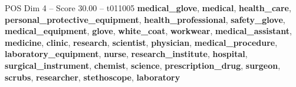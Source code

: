 \begin{textsample}{POS Dim 4 – Score 30.00 – t011005}  \label{ex:f4_pos_011}
\textbf{medical\_glove}, \textbf{medical}, \textbf{health\_care}, \textbf{personal\_protective\_equipment}, \textbf{health\_professional}, \textbf{safety\_glove}, \textbf{medical\_equipment}, \textbf{glove}, \textbf{white\_coat}, \textbf{workwear}, \textbf{medical\_assistant}, \textbf{medicine}, \textbf{clinic}, \textbf{research}, \textbf{scientist}, \textbf{physician}, \textbf{medical\_procedure}, \textbf{laboratory\_equipment}, \textbf{nurse}, \textbf{research\_institute}, \textbf{hospital}, \textbf{surgical\_instrument}, \textbf{chemist}, \textbf{science}, \textbf{prescription\_drug}, \textbf{surgeon}, \textbf{scrubs}, \textbf{researcher}, \textbf{stethoscope}, \textbf{laboratory}

\end{textsample}
